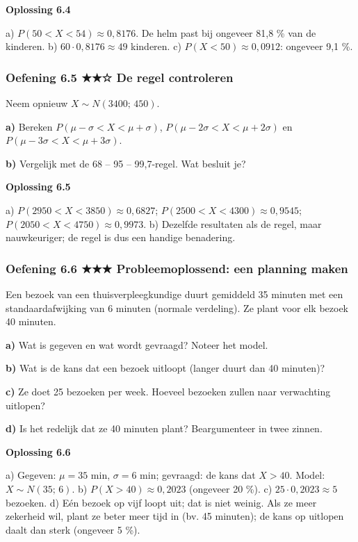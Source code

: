 \begin{oplossing}
\textbf{Oplossing 6.4}

a) $P(50<X<54)\approx 0{,}8176$. De helm past bij ongeveer 81,8 \% van de kinderen. b) $60\cdot 0{,}8176\approx 49$ kinderen. c) $P(X<50)\approx 0{,}0912$: ongeveer 9,1 \%.
\end{oplossing}

\subsubsection*{Oefening 6.5 \quad ★★☆ \quad De regel controleren}

Neem opnieuw $X\sim N(3400;\,450)$.

\textbf{a)} Bereken $P(\mu-\sigma<X<\mu+\sigma)$, $P(\mu-2\sigma<X<\mu+2\sigma)$ en $P(\mu-3\sigma<X<\mu+3\sigma)$. \lijn

\textbf{b)} Vergelijk met de 68 – 95 – 99,7-regel. Wat besluit je? \lijn

\begin{oplossing}
\textbf{Oplossing 6.5}

a) $P(2950<X<3850)\approx 0{,}6827$; $P(2500<X<4300)\approx 0{,}9545$; $P(2050<X<4750)\approx 0{,}9973$. b) Dezelfde resultaten als de regel, maar nauwkeuriger; de regel is dus een handige benadering.
\end{oplossing}

\subsubsection*{Oefening 6.6 \quad ★★★ \quad Probleemoplossend: een planning maken}

Een bezoek van een thuisverpleegkundige duurt gemiddeld 35 minuten met een standaardafwijking van 6 minuten (normale verdeling). Ze plant voor elk bezoek 40 minuten.

\textbf{a)} Wat is gegeven en wat wordt gevraagd? Noteer het model. \lijn

\textbf{b)} Wat is de kans dat een bezoek uitloopt (langer duurt dan 40 minuten)? \lijn

\textbf{c)} Ze doet 25 bezoeken per week. Hoeveel bezoeken zullen naar verwachting uitlopen? \lijn

\textbf{d)} Is het redelijk dat ze 40 minuten plant? Beargumenteer in twee zinnen. \lijn

\begin{oplossing}
\textbf{Oplossing 6.6}

a) Gegeven: $\mu=35$ min, $\sigma=6$ min; gevraagd: de kans dat $X>40$. Model: $X\sim N(35;\,6)$. b) $P(X>40)\approx 0{,}2023$ (ongeveer 20 \%). c) $25\cdot 0{,}2023\approx 5$ bezoeken. d) Eén bezoek op vijf loopt uit; dat is niet weinig. Als ze meer zekerheid wil, plant ze beter meer tijd in (bv. 45 minuten); de kans op uitlopen daalt dan sterk (ongeveer 5 \%).
\end{oplossing}


